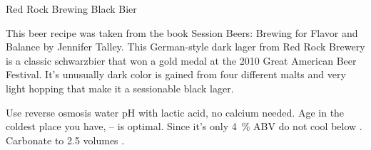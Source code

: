 \stylesection{\styleschwarzbier}

\begin{recipie}{Red Rock Brewing Black Bier}

\begin{aboutblock}
This beer recipe was taken from the book Session Beers: Brewing for Flavor and
Balance by Jennifer Talley. This German-style dark lager from Red Rock Brewery
is a classic schwarzbier that won a gold medal at the 2010 Great American Beer
Festival. It's unusually dark color is gained from four different malts and very
light hopping that make it a sessionable black lager.
\end{aboutblock}


\begin{methodandtiming}
 
\begin{mashsteps}
\end{mashsteps}

\begin{fermentationsteps}
\end{fermentationsteps}

\begin{directions}
Use reverse osmosis water pH with lactic acid, no calcium needed.
Age in the coldest place you have, -- is optimal. Since it's
only 4~\% ABV do not cool below . Carbonate to 2.5 volumes .
\end{directions}

\end{methodandtiming}

\pagebreak

\begin{ingredientsblock}

\begin{malts}
\end{malts}

\begin{hops}
\end{hops}

\begin{yeasts}
\end{yeasts}

\end{ingredientsblock}

\end{recipie}
